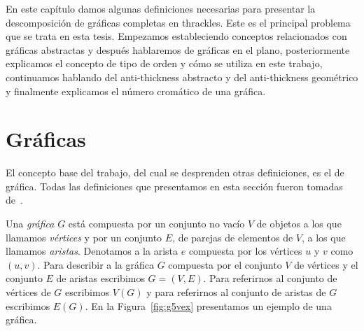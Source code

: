 En este capítulo damos algunas definiciones necesarias para presentar la descomposición de gráficas completas en thrackles. Este
es el principal problema que se trata en esta tesis.
Empezamos estableciendo conceptos relacionados con gráficas abstractas y después
hablaremos de gráficas en el plano, posteriormente explicamos el concepto de tipo de orden y cómo
se utiliza en este trabajo, continuamos hablando del anti-thickness abstracto
y del anti-thickness geométrico y finalmente explicamos el número cromático de una gráfica.

\section{Gráficas}
El concepto base del trabajo, del cual se desprenden otras definiciones, es el de gráfica.
Todas las definiciones que presentamos en esta sección fueron tomadas de~\cite{Chartrand2008}.

Una \emph{gráfica} $G$ está compuesta por un conjunto no vacío $V$ de objetos a los que llamamos \emph{vértices}
y por un conjunto $E$, de parejas de elementos de $V$, a los que llamamos \emph{aristas}. Denotamos
a la arista $e$ compuesta por los vértices $u$ y $v$ como $(u,v)$. Para describir a la gráfica $G$
compuesta por el conjunto $V$ de vértices y el conjunto $E$ de aristas escribimos $G=(V,E)$.
Para referirnos al conjunto de vértices de $G$ escribimos $V(G)$ y para referirnos
al conjunto de aristas de $G$ escribimos $E(G)$. En la Figura~\ref{fig:g5vex} presentamos
un ejemplo de una gráfica.

